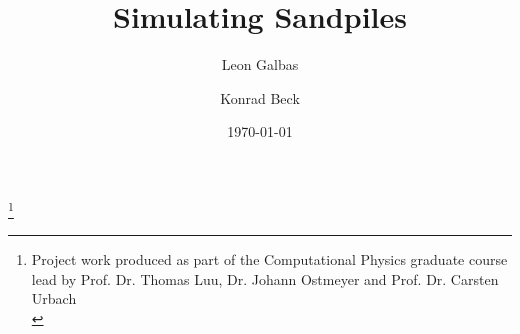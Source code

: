 \title{Simulating Sandpiles}%
\thanks{
    Project work produced as part of the Computational Physics graduate course lead by
    Prof. Dr. Thomas Luu, Dr. Johann Ostmeyer and Prof. Dr. Carsten Urbach \\
}%

\author{Leon Galbas}

\author{Konrad Beck}%



\date{\today}%
